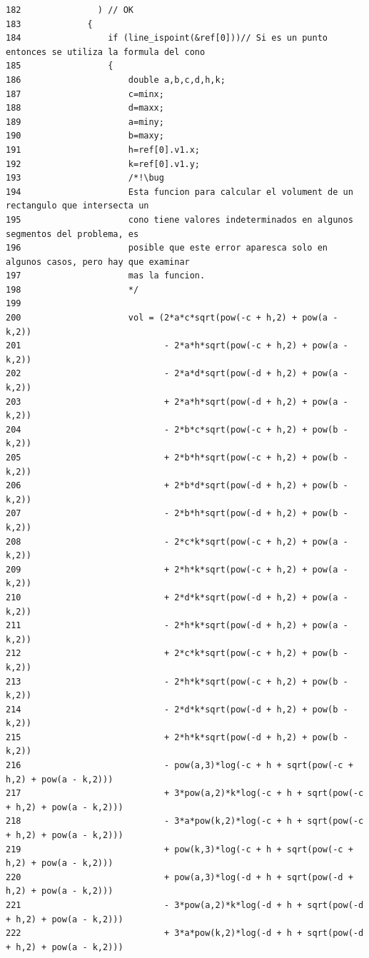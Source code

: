 \begin{Code}
\begin{verbatim}
182               ) // OK
183             {
184                 if (line_ispoint(&ref[0]))// Si es un punto entonces se utiliza la formula del cono
185                 {
186                     double a,b,c,d,h,k;
187                     c=minx;
188                     d=maxx;
189                     a=miny;
190                     b=maxy;
191                     h=ref[0].v1.x;
192                     k=ref[0].v1.y;
193                     /*!\bug
194                     Esta funcion para calcular el volument de un rectangulo que intersecta un
195                     cono tiene valores indeterminados en algunos segmentos del problema, es
196                     posible que este error aparesca solo en algunos casos, pero hay que examinar
197                     mas la funcion.
198                     */
199 
200                     vol = (2*a*c*sqrt(pow(-c + h,2) + pow(a - k,2))
201                            - 2*a*h*sqrt(pow(-c + h,2) + pow(a - k,2))
202                            - 2*a*d*sqrt(pow(-d + h,2) + pow(a - k,2))
203                            + 2*a*h*sqrt(pow(-d + h,2) + pow(a - k,2))
204                            - 2*b*c*sqrt(pow(-c + h,2) + pow(b - k,2))
205                            + 2*b*h*sqrt(pow(-c + h,2) + pow(b - k,2))
206                            + 2*b*d*sqrt(pow(-d + h,2) + pow(b - k,2))
207                            - 2*b*h*sqrt(pow(-d + h,2) + pow(b - k,2))
208                            - 2*c*k*sqrt(pow(-c + h,2) + pow(a - k,2))
209                            + 2*h*k*sqrt(pow(-c + h,2) + pow(a - k,2))
210                            + 2*d*k*sqrt(pow(-d + h,2) + pow(a - k,2))
211                            - 2*h*k*sqrt(pow(-d + h,2) + pow(a - k,2))
212                            + 2*c*k*sqrt(pow(-c + h,2) + pow(b - k,2))
213                            - 2*h*k*sqrt(pow(-c + h,2) + pow(b - k,2))
214                            - 2*d*k*sqrt(pow(-d + h,2) + pow(b - k,2))
215                            + 2*h*k*sqrt(pow(-d + h,2) + pow(b - k,2))
216                            - pow(a,3)*log(-c + h + sqrt(pow(-c + h,2) + pow(a - k,2)))
217                            + 3*pow(a,2)*k*log(-c + h + sqrt(pow(-c + h,2) + pow(a - k,2)))
218                            - 3*a*pow(k,2)*log(-c + h + sqrt(pow(-c + h,2) + pow(a - k,2)))
219                            + pow(k,3)*log(-c + h + sqrt(pow(-c + h,2) + pow(a - k,2)))
220                            + pow(a,3)*log(-d + h + sqrt(pow(-d + h,2) + pow(a - k,2)))
221                            - 3*pow(a,2)*k*log(-d + h + sqrt(pow(-d + h,2) + pow(a - k,2)))
222                            + 3*a*pow(k,2)*log(-d + h + sqrt(pow(-d + h,2) + pow(a - k,2)))

\end{verbatim}
\end{Code}
